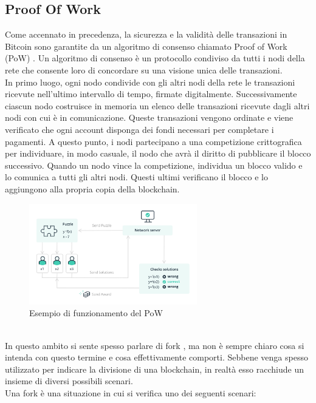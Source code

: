 \subsection{Proof Of Work}
Come accennato in precedenza, la sicurezza e la validità delle transazioni in Bitcoin sono garantite da un algoritmo di consenso chiamato Proof of Work (PoW) \cite{Blockchain_guida_allecosistema}. Un algoritmo di consenso è un protocollo condiviso da tutti i nodi della rete che consente loro di concordare su una visione unica delle transazioni.
\\In primo luogo, ogni nodo condivide con gli altri nodi della rete le transazioni ricevute nell’ultimo intervallo di tempo, firmate digitalmente. Successivamente ciascun nodo costruisce in memoria un elenco delle transazioni ricevute dagli altri nodi con cui è in comunicazione. Queste transazioni vengono ordinate e viene verificato che ogni account disponga dei fondi necessari per completare i pagamenti.
A questo punto, i nodi partecipano a una competizione crittografica per individuare, in modo casuale, il nodo che avrà il diritto di pubblicare il blocco successivo. Quando un nodo vince la competizione, individua un blocco valido e lo comunica a tutti gli altri nodi. Questi ultimi verificano il blocco e lo aggiungono alla propria copia della blockchain.
\begin{figure}[h]
\centering
\includegraphics[width=0.65\textwidth]{Immagini/proof of work scheme.jpg}
\caption{Esempio di funzionamento del PoW}
\end{figure}
\\
In questo ambito si sente spesso parlare di fork \cite{Blockchain_tecnologia_e_applicazioni_per_il_business}, ma non è sempre chiaro cosa si intenda con questo termine e cosa effettivamente comporti. Sebbene venga spesso utilizzato per indicare la divisione di una blockchain, in realtà esso racchiude un insieme di diversi possibili scenari. 
\\Una fork è una situazione in cui si verifica uno dei seguenti scenari:
